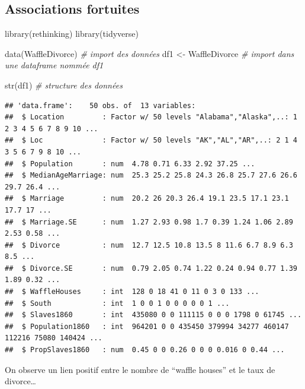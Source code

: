 \documentclass[
  a4paper,11pt,twoside,onecolumn,openright,final,oldfontcommands]{memoir}
\newenvironment{Shaded}{\begin{snugshade}}{\end{snugshade}}
\newcommand{\CommentTok}[1]{\textcolor[rgb]{0.56,0.35,0.01}{\textit{#1}}}
\newcommand{\FunctionTok}[1]{\textcolor[rgb]{0.00,0.00,0.00}{#1}}
\newcommand{\NormalTok}[1]{#1}
\newcommand{\OtherTok}[1]{\textcolor[rgb]{0.56,0.35,0.01}{#1}}
\theoremstyle{definition}
\theoremstyle{definition}
\theoremstyle{definition}
\theoremstyle{definition}
\theoremstyle{remark}
\begin{document}
\hypertarget{associations-fortuites}{%
\subsection{Associations fortuites}\label{associations-fortuites}}

\begin{Shaded}
\begin{Highlighting}[]
\FunctionTok{library}\NormalTok{(rethinking)}
\FunctionTok{library}\NormalTok{(tidyverse)}

\FunctionTok{data}\NormalTok{(WaffleDivorce) }\CommentTok{\# import des données}
\NormalTok{df1 }\OtherTok{\textless{}{-}}\NormalTok{ WaffleDivorce }\CommentTok{\# import dans une dataframe nommée df1}

\FunctionTok{str}\NormalTok{(df1) }\CommentTok{\# structure des données}
\end{Highlighting}
\end{Shaded}

\begin{verbatim}
## 'data.frame':    50 obs. of  13 variables:
##  $ Location         : Factor w/ 50 levels "Alabama","Alaska",..: 1 2 3 4 5 6 7 8 9 10 ...
##  $ Loc              : Factor w/ 50 levels "AK","AL","AR",..: 2 1 4 3 5 6 7 9 8 10 ...
##  $ Population       : num  4.78 0.71 6.33 2.92 37.25 ...
##  $ MedianAgeMarriage: num  25.3 25.2 25.8 24.3 26.8 25.7 27.6 26.6 29.7 26.4 ...
##  $ Marriage         : num  20.2 26 20.3 26.4 19.1 23.5 17.1 23.1 17.7 17 ...
##  $ Marriage.SE      : num  1.27 2.93 0.98 1.7 0.39 1.24 1.06 2.89 2.53 0.58 ...
##  $ Divorce          : num  12.7 12.5 10.8 13.5 8 11.6 6.7 8.9 6.3 8.5 ...
##  $ Divorce.SE       : num  0.79 2.05 0.74 1.22 0.24 0.94 0.77 1.39 1.89 0.32 ...
##  $ WaffleHouses     : int  128 0 18 41 0 11 0 3 0 133 ...
##  $ South            : int  1 0 0 1 0 0 0 0 0 1 ...
##  $ Slaves1860       : int  435080 0 0 111115 0 0 0 1798 0 61745 ...
##  $ Population1860   : int  964201 0 0 435450 379994 34277 460147 112216 75080 140424 ...
##  $ PropSlaves1860   : num  0.45 0 0 0.26 0 0 0 0.016 0 0.44 ...
\end{verbatim}

On observe un lien positif entre le nombre de ``waffle houses'' et le taux de divorce\ldots{}
\end{document}
